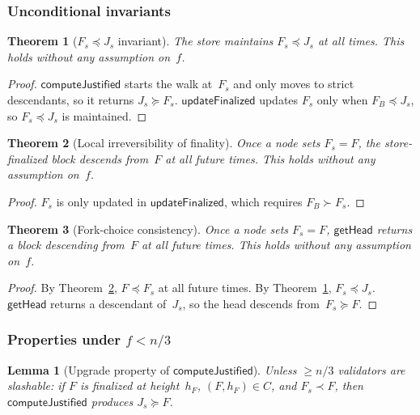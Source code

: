 \documentclass{article}
\theoremstyle{plain}
\newtheorem{theorem}{Theorem}
\newtheorem{lemma}{Lemma}
\theoremstyle{definition}
\theoremstyle{remark}
\begin{document}
\subsubsection*{Unconditional invariants}

\begin{theorem}[$F_s \preceq J_s$ invariant]\label{thm:fleqj}
The store maintains $F_s \preceq J_s$ at all times.
This holds without any assumption on~$f$.
\end{theorem}

\begin{proof}
$\textsf{computeJustified}$ starts the walk at~$F_s$ and only moves to strict descendants, so it returns $J_s \succeq F_s$.
$\textsf{updateFinalized}$ updates $F_s$ only when $F_B \preceq J_s$, so $F_s \preceq J_s$ is maintained.
\end{proof}

\begin{theorem}[Local irreversibility of finality]\label{thm:finperm}
Once a node sets $F_s = F$, the store-finalized block descends from~$F$ at all future times.
This holds without any assumption on~$f$.
\end{theorem}

\begin{proof}
$F_s$ is only updated in $\textsf{updateFinalized}$, which requires $F_B \succ F_s$.
\end{proof}

\begin{theorem}[Fork-choice consistency]\label{thm:fcconsistency}
Once a node sets $F_s = F$, $\textsf{getHead}$ returns a block descending from~$F$ at all future times.
This holds without any assumption on~$f$.
\end{theorem}

\begin{proof}
By Theorem~\ref{thm:finperm}, $F \preceq F_s$ at all future times.
By Theorem~\ref{thm:fleqj}, $F_s \preceq J_s$.
$\textsf{getHead}$ returns a descendant of~$J_s$, so the head descends from~$F_s \succeq F$.
\end{proof}

\subsubsection*{Properties under $f < n/3$}

\begin{lemma}[Upgrade property of $\textsf{computeJustified}$]\label{lem:upgrade}
Unless $\geq n/3$ validators are slashable: if $F$ is finalized at height~$h_F$, $(F, h_F) \in C$, and $F_s \prec F$, then $\textsf{computeJustified}$ produces $J_s \succeq F$.
\end{lemma}
\end{document}
